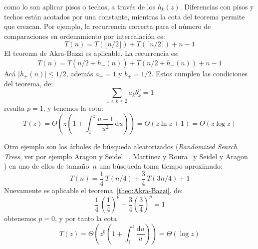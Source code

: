   como lo son aplicar pisos o techos,
  a través de los \(h_k(z)\).
  Diferencias con pisos y techos están acotados por una constante,
  mientras la cota del teorema permite que crezcan.
  Por ejemplo,
  la recurrencia correcta para el número de comparaciones
  en ordenamiento por intercalación es:
  \begin{equation*}
    T(n)
      = T(\lfloor n / 2 \rfloor) + T(\lceil n / 2 \rceil) + n - 1
  \end{equation*}
  El teorema de Akra-Bazzi es aplicable.
  La recurrencia es:
  \begin{equation*}
    T(n)
      = T(n / 2 + h_{+}(n)) + T(n / 2 + h_{-}(n)) + n - 1
  \end{equation*}
  Acá \(\lvert h_{\pm}(n) \rvert \le 1/2\),
  además \(a_{\pm} = 1\) y \(b_{\pm} = 1/2\).
  Estos cumplen las condiciones del teorema,
  de:
  \begin{equation*}
    \sum_{1 \le k \le 2} a_k b_k^p = 1
  \end{equation*}
  resulta \(p = 1\),
  y tenemos la cota:
  \begin{equation*}
    T(z)
      = \Theta
	  \left(
	    z \left(
	  1 + \int_1^z \frac{u - 1}{u^2} \, \mathrm{d} u
	      \right)
	  \right)
      = \Theta
	  \left(
	    z \ln z + 1
	  \right)
      = \Theta(z \log z)
  \end{equation*}

  Otro ejemplo son los árboles de búsqueda aleatorizados
  (\emph{\foreignlanguage{english}{Randomized Search Trees}},
   ver por ejemplo Aragon y Seidel~%
     \cite{aragon89:_random_search_tree},
   Martínez y Roura~%
     \cite{martinez98:_random_binar_searc_trees}
   y Seidel y Aragon~%
     \cite{seidel96:_random_search_trees})
  en uno de ellos de tamaño~\(n\)
  una búsqueda toma tiempo aproximado:
  \begin{equation*}
    T(n)
      = \frac{1}{4} \, T(n / 4) + \frac{3}{4} \, T(3 n / 4) + 1
  \end{equation*}
  Nuevamente es aplicable el teorema~\ref{theo:Akra-Bazzi},
  de:
  \begin{equation*}
    \frac{1}{4} \, \left(\frac{1}{4}\right)^p
	+ \frac{3}{4} \left(\frac{3}{4}\right)^p
      = 1
  \end{equation*}
  obtenemos \(p = 0\),
  y por tanto la cota
  \begin{equation*}
    T(z)
      = \Theta \left(
	  z^0 \left( 1 + \int_1^z \frac{\mathrm{d} u}{u} \right)
	\right)
      = \Theta ( \log z )
  \end{equation*}



